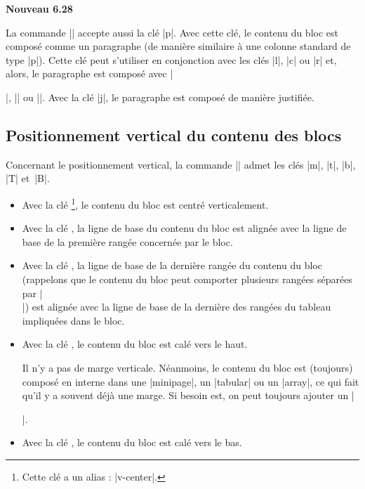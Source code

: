 \documentclass[dvipsnames]{article}%
\begin{document}
\bigskip
\colorbox{yellow!50}{\bfseries Nouveau 6.28}\par\nobreak

\smallskip
La commande |\Block| accepte aussi la clé |p|. Avec cette clé, le contenu du
bloc est composé comme un paragraphe (de manière similaire à une colonne
standard de type |p|). Cette clé peut s'utiliser en conjonction avec les clés
|l|, |c| ou |r| et, alors, le paragraphe est composé avec |\raggedright|,
|\centering| ou |\raggedleft|. Avec la clé |j|, le paragraphe est composé de
manière justifiée.


\subsection{Positionnement vertical du contenu des blocs}


\label{vertical-pos-block}

Concernant le positionnement vertical, la commande |\Block| admet les clés
|m|, |t|, |b|, |T| et~|B|.


\begin{itemize}
\item {}
Avec la clé \footnote{Cette clé a un alias : |v-center|.}, le contenu du bloc est centré verticalement.

\item Avec la clé , la ligne de base du contenu du bloc est alignée avec la
ligne de base de la première rangée concernée par le bloc.

\item Avec la clé , la ligne de base de la dernière rangée du contenu du bloc
(rappelons que le contenu du bloc peut comporter plusieurs rangées séparées par
|\\|) est alignée avec la ligne de base de la dernière des rangées du tableau
impliquées dans le bloc.

\item Avec la clé , le contenu du bloc est calé vers le haut.

Il n'y a pas de marge verticale. Néanmoins, le contenu du bloc est (toujours)
composé en interne dans une |{minipage}|, un |{tabular}| ou un |{array}|, ce qui
fait qu'il y a souvent déjà une marge. Si besoin est, on peut toujours ajouter
un |\strut|.

\item Avec la clé , le contenu du bloc est calé vers le bas.
\end{itemize}
\end{document}

